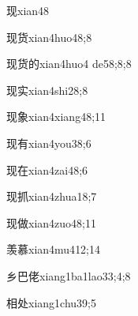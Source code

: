 \begin{verbete}{现}{xian4}{8}
\end{verbete}

\begin{verbete}{现货}{xian4huo4}{8;8}
\end{verbete}

\begin{verbete}{现货的}{xian4huo4 de5}{8;8;8}
\end{verbete}

\begin{verbete}{现实}{xian4shi2}{8;8}
\end{verbete}

\begin{verbete}{现象}{xian4xiang4}{8;11}
\end{verbete}

\begin{verbete}{现有}{xian4you3}{8;6}
\end{verbete}

\begin{verbete}{现在}{xian4zai4}{8;6}
\end{verbete}

\begin{verbete}{现抓}{xian4zhua1}{8;7}
\end{verbete}

\begin{verbete}{现做}{xian4zuo4}{8;11}
\end{verbete}

\begin{verbete}{羡慕}{xian4mu4}{12;14}
\end{verbete}

\begin{verbete}{乡巴佬}{xiang1ba1lao3}{3;4;8}
\end{verbete}

\begin{verbete}{相处}{xiang1chu3}{9;5}
\end{verbete}

